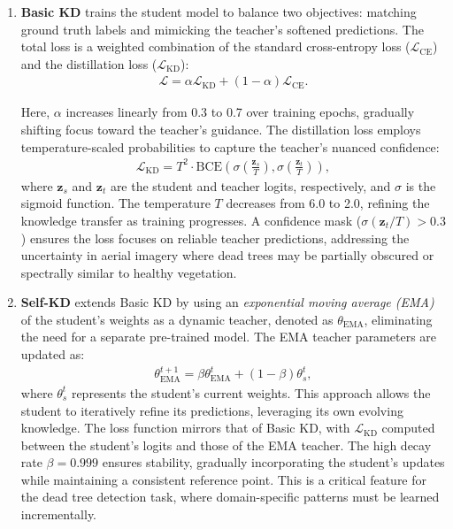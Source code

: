 \documentclass[twocolumn]{article}
\begin{document}
\begin{enumerate}
\item\textbf{Basic KD} trains the student model to balance two objectives: matching ground truth labels and mimicking the teacher's softened predictions. The total loss is a weighted combination of the standard cross-entropy loss ($\mathcal{L}_{\text{CE}}$) and the distillation loss ($\mathcal{L}_{\text{KD}}$):
\begin{align}
\mathcal{L} = \alpha \mathcal{L}_{\text{KD}} + (1 - \alpha) \mathcal{L}_{\text{CE}}.
\end{align}

Here, $\alpha$ increases linearly from 0.3 to 0.7 over training epochs, gradually shifting focus toward the teacher's guidance. The distillation loss employs temperature-scaled probabilities to capture the teacher's nuanced confidence:
\begin{align}
\mathcal{L}_{\text{KD}} = T^2 \cdot \text{BCE} \left( \sigma \left( \frac{\mathbf{z}_s}{T} \right), \sigma \left( \frac{\mathbf{z}_t}{T} \right) \right),
\end{align}
where $\mathbf{z}_s$ and $\mathbf{z}_t$ are the student and teacher logits, respectively, and $\sigma$ is the sigmoid function. The temperature $T$ decreases from 6.0 to 2.0, refining the knowledge transfer as training progresses. A confidence mask ($\sigma(\mathbf{z}_t / T) > 0.3$) ensures the loss focuses on reliable teacher predictions, addressing the uncertainty in aerial imagery where dead trees may be partially obscured or spectrally similar to healthy vegetation.

\item\textbf{Self-KD} extends Basic KD by using an \textit{exponential moving average (EMA)} of the student's weights as a dynamic teacher, denoted as $\theta_\text{EMA}$, eliminating the need for a separate pre-trained model. The EMA teacher parameters are updated as:
\begin{align}
\theta_{\text{EMA}}^{t+1} = \beta \theta_{\text{EMA}}^t + (1 - \beta) \theta_s^t,
\end{align}
where $\theta_s^t$ represents the student's current weights. This approach allows the student to iteratively refine its predictions, leveraging its own evolving knowledge. The loss function mirrors that of Basic KD, with $\mathcal{L}_{\text{KD}}$ computed between the student's logits and those of the EMA teacher. The high decay rate $\beta = 0.999$ ensures stability, gradually incorporating the student's updates while maintaining a consistent reference point. This is a critical feature for the dead tree detection task, where domain-specific patterns must be learned incrementally.


\end{enumerate}
\end{document}
